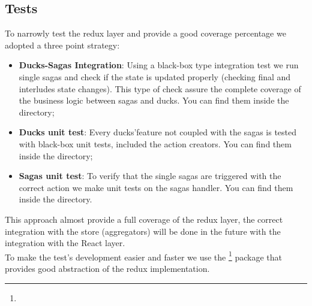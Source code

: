 \documentclass[../redux]{subfiles}
\begin{document}
	\subsection{Tests}
	To narrowly test the redux layer and provide a good coverage percentage we adopted a three point strategy:
	\begin{itemize}
		\item \textbf{Ducks-Sagas Integration}: Using a black-box type integration test we run single sagas and check if the state is updated properly (checking final and interludes state changes). This type of check assure the complete coverage of the business logic between sagas and ducks. You can find them inside the  directory;
		\item \textbf{Ducks unit test}: Every ducks'feature not coupled with the sagas is tested with black-box unit tests, included the action creators. You can find them inside the  directory;
		\item \textbf{Sagas unit test}: To verify that the single sagas are triggered with the correct action we make unit tests on the sagas handler. You can find them inside the  directory.
	\end{itemize}
	This approach almost provide a full coverage of the redux layer, the correct integration with the store (aggregators) will be done in the future with the integration with the React layer.\\
	To make the test's development easier and faster we use the \footnote{} package that provides good abstraction of the redux implementation.
\end{document}
